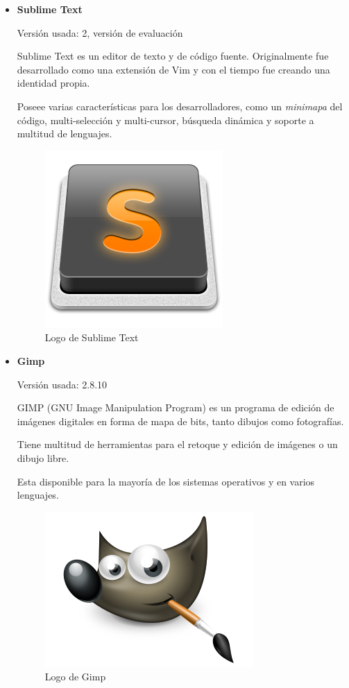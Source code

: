 \begin{itemize}
	\item \textbf{Sublime Text}
			
	Versión usada: 2, versión de evaluación
		
	Sublime Text \cite{sublimetext} es un editor de texto y de código fuente. Originalmente fue desarrollado como una extensión de Vim y con el tiempo fue creando una identidad propia.

	Poseee varias características para los desarrolladores, como un \textit{minimapa} del código, multi-selección y multi-cursor, búsqueda dinámica y soporte a multitud de lenguajes.


	\bigskip
	\begin{figure}[h]
		\centering
		\includegraphics[width=0.3\linewidth]{../images/sublimetextlogo}
		\caption[Logo de Sublime Text]{Logo de Sublime Text}
		\label{fig:sublimetextlogo}
	\end{figure}
				
	\item \textbf{Gimp}
			
	Versión usada: 2.8.10
		
	GIMP (GNU Image Manipulation Program) \cite{gimp} es un programa de edición de imágenes digitales en forma de mapa de bits, tanto dibujos como fotografías. 

	Tiene multitud de herramientas para el retoque y edición de imágenes o un dibujo libre.

	Esta disponible para la mayoría de los sistemas operativos y en varios lenguajes.

	\bigskip
	\begin{figure}[h]
		\centering
		\includegraphics[width=0.3\linewidth]{../images/gimplogo}
		\caption[Logo de Gimp]{Logo de Gimp}
		\label{fig:gimplogo}
	\end{figure}
	

\end{itemize}

